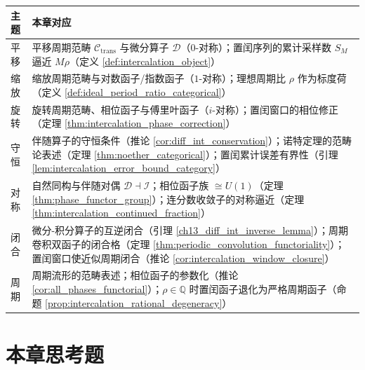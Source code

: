 \begin{center}
\begin{tabular}{>{\centering\arraybackslash}p{2.2cm}>{\centering\arraybackslash}p{10.5cm}}
\toprule
主题 & 本章对应 \\
\midrule
平移 & 平移周期范畴 $\mathcal{C}_{\text{trans}}$ 与微分算子 $\mathcal{D}$（$0$-对称）；置闰序列的累计采样数 $S_M$ 逼近 $M\rho$（定义 \ref{def:intercalation_object}） \\
缩放 & 缩放周期范畴与对数函子/指数函子（$1$-对称）；理想周期比 $\rho$ 作为标度荷（定义 \ref{def:ideal_period_ratio_categorical}） \\
旋转 & 旋转周期范畴、相位函子与傅里叶函子（$i$-对称）；置闰窗口的相位修正（定理 \ref{thm:intercalation_phase_correction}） \\
守恒 & 伴随算子的守恒条件（推论 \ref{cor:diff_int_conservation}）；诺特定理的范畴论表述（定理 \ref{thm:noether_categorical}）；置闰累计误差有界性（引理 \ref{lem:intercalation_error_bound_category}） \\
对称 & 自然同构与伴随对偶 $\mathcal{D}\dashv\mathcal{I}$；相位函子族 $\cong U(1)$（定理 \ref{thm:phase_functor_group}）；连分数收敛子的对称逼近（定理 \ref{thm:intercalation_continued_fraction}） \\
闭合 & 微分-积分算子的互逆闭合（引理 \ref{ch13_diff_int_inverse_lemma}）；周期卷积双函子的闭合格（定理 \ref{thm:periodic_convolution_functoriality}）；置闰窗口使近似周期闭合（推论 \ref{cor:intercalation_window_closure}） \\
周期 & 周期流形的范畴表述；相位函子的参数化（推论 \ref{cor:all_phases_functorial}）；$\rho\in\mathbb{Q}$ 时置闰函子退化为严格周期函子（命题 \ref{prop:intercalation_rational_degeneracy}） \\
\bottomrule
\end{tabular}
\end{center}

\section*{本章思考题}

